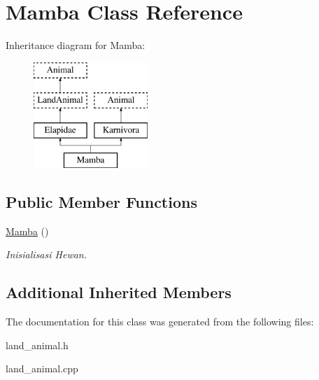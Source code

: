 \hypertarget{class_mamba}{}\section{Mamba Class Reference}
\label{class_mamba}
Inheritance diagram for Mamba\+:\begin{figure}[H]
\begin{center}
\leavevmode
\includegraphics[height=4.000000cm]{class_mamba}
\end{center}
\end{figure}
\subsection*{Public Member Functions}
\begin{DoxyCompactItemize}
\item 
\hyperlink{class_mamba_aa4dfbdbaf96017c0ee7568721466c346}{Mamba} ()\hypertarget{class_mamba_aa4dfbdbaf96017c0ee7568721466c346}{}\label{class_mamba_aa4dfbdbaf96017c0ee7568721466c346}

\begin{DoxyCompactList}\small\item\em Inisialisasi Hewan. \end{DoxyCompactList}\end{DoxyCompactItemize}
\subsection*{Additional Inherited Members}


The documentation for this class was generated from the following files\+:\begin{DoxyCompactItemize}
\item 
land\+\_\+animal.\+h\item 
land\+\_\+animal.\+cpp\end{DoxyCompactItemize}
